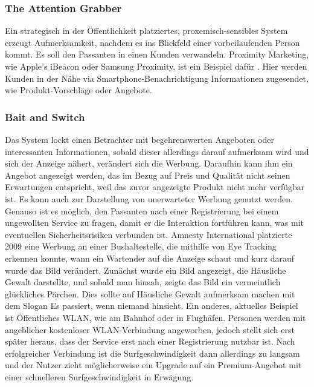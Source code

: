 \documentclass[a4paper]{article}
\begin{document}
\subsubsection{The Attention Grabber}
\label{sssec:the_attention_grabber}
Ein strategisch in der Öffentlichkeit platziertes, proxemisch-sensibles System erzeugt Aufmerksamkeit, nachdem es ins Blickfeld einer vorbeilaufenden Person kommt. Es soll den Passanten in einen Kunden verwandeln.\newline
Proximity Marketing, wie Apple's iBeacon oder Samsung Proximity, ist ein Beispiel dafür \cite{proximity_marketing} \cite{proximity_marketing2}. Hier werden Kunden in der Nähe via Smartphone-Benachrichtigung Informationen zugesendet, wie Produkt-Vorschläge oder Angebote.

\subsubsection{Bait and Switch}
\label{sssec:bait_and_switch2}
Das System lockt einen Betrachter mit begehrenswerten Angeboten oder interessanten Informationen, sobald dieser allerdings darauf aufmerksam wird und sich der Anzeige nähert, verändert sich die Werbung. Daraufhin kann ihm ein Angebot angezeigt werden, das im Bezug auf Preis und Qualität nicht seinen Erwartungen entspricht, weil das zuvor angezeigte Produkt nicht mehr verfügbar ist. Es kann auch zur Darstellung von unerwarteter Werbung genutzt werden. Genauso ist es möglich, den Passanten nach einer Registrierung bei einem ungewollten Service zu fragen, damit er die Interaktion fortführen kann, was mit eventuellen Sicherheitsrisiken verbunden ist.\newline
Amnesty International platzierte 2009 eine Werbung an einer Bushaltestelle, die mithilfe von Eye Tracking erkennen konnte, wann ein Wartender auf die Anzeige schaut und kurz darauf wurde das Bild verändert. Zunächst wurde ein Bild angezeigt, die Häusliche Gewalt darstellte, und sobald man hinsah, zeigte das Bild ein vermeintlich glückliches Pärchen. Dies sollte auf Häusliche Gewalt aufmerksam machen mit dem Slogan \glqq Es passiert, wenn niemand hinsieht.\grqq{} \cite{amnesty_international}
Ein anderes, aktuelles Beispiel ist Öffentliches WLAN, wie am Bahnhof oder in Flughäfen. Personen werden mit angeblicher kostenloser WLAN-Verbindung angeworben, jedoch stellt sich erst später heraus, dass der Service erst nach einer Registrierung nutzbar ist. Nach erfolgreicher Verbindung ist die Surfgeschwindigkeit dann allerdings zu langsam und der Nutzer zieht möglicherweise ein Upgrade auf ein Premium-Angebot mit einer schnelleren Surfgeschwindigkeit in Erwägung.
\end{document}

